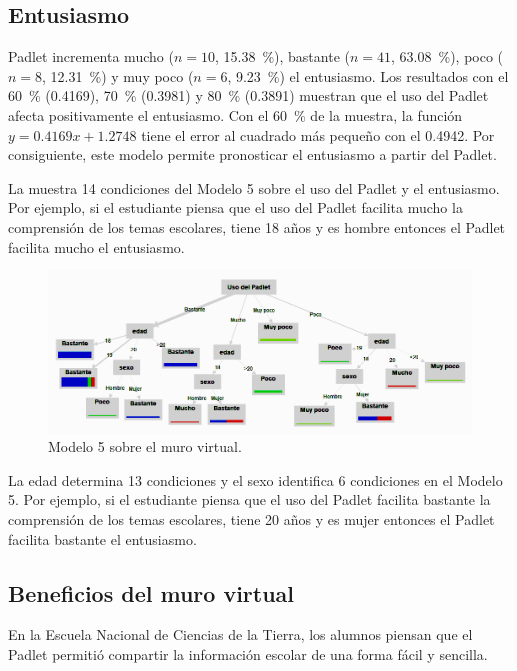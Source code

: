 \documentclass[spanish]{textolivre}
\begin{document}
\subsection{Entusiasmo}\label{sec-secoes}
Padlet incrementa mucho ($n = 10$, 15.38~\%), bastante ($n = 41$, 63.08~\%), poco ($n = 8$, 12.31~\%) y muy poco ($n = 6$, 9.23~\%) el entusiasmo. Los resultados con el 60~\% (0.4169), 70~\% (0.3981) y 80~\% (0.3891) muestran que el uso del Padlet afecta positivamente el entusiasmo. Con el 60~\% de la muestra, la función $y = 0.4169x + 1.2748$ tiene el error al cuadrado más pequeño con el 0.4942. Por consiguiente, este modelo permite pronosticar el entusiasmo a partir del Padlet.

La  muestra 14 condiciones del Modelo 5 sobre el uso del Padlet y el entusiasmo. Por ejemplo, si el estudiante piensa que el uso del Padlet facilita mucho la comprensión de los temas escolares, tiene 18 años y es hombre entonces el Padlet facilita mucho el entusiasmo.

\begin{figure}[h]
\centering
\begin{minipage}{.85\textwidth}
    \includegraphics[width=\linewidth]{Fig7.png}
    \caption{Modelo 5 sobre el muro virtual.}
    \label{fig7}
\end{minipage}
\end{figure}

La edad determina 13 condiciones y el sexo identifica 6 condiciones en el Modelo 5. Por ejemplo, si el estudiante piensa que el uso del Padlet facilita bastante la comprensión de los temas escolares, tiene 20 años y es mujer entonces el Padlet facilita bastante el entusiasmo.

\subsection{Beneficios del muro virtual}\label{sec-format-simple}
En la Escuela Nacional de Ciencias de la Tierra, los alumnos piensan que el Padlet permitió compartir la información escolar de una forma fácil y sencilla.
\end{document}
